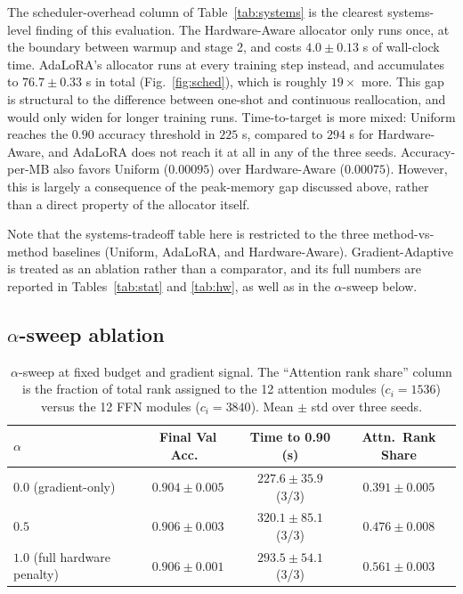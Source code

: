 \documentclass{article}
\begin{document}
The scheduler-overhead column of Table~\ref{tab:systems} is the
clearest systems-level finding of this evaluation. The Hardware-Aware
allocator only runs once, at the boundary between warmup and stage 2,
and costs $\mathbf{4.0 \pm 0.13}$ s of wall-clock time. AdaLoRA's
allocator runs at every training step instead, and accumulates to
$\mathbf{76.7 \pm 0.33}$ s in total (Fig.~\ref{fig:sched}), which is
roughly $19\times$ more. This gap is structural to the difference
between one-shot and continuous reallocation, and would only widen for
longer training runs. Time-to-target is more mixed: Uniform reaches
the $0.90$ accuracy threshold in $225$ s, compared to $294$ s for
Hardware-Aware, and AdaLoRA does not reach it at all in any of the
three seeds. Accuracy-per-MB also favors Uniform ($0.00095$) over
Hardware-Aware ($0.00075$). However, this is largely a consequence of
the peak-memory gap discussed above, rather than a direct property of
the allocator itself.

Note that the systems-tradeoff table here is restricted to the three
method-vs-method baselines (Uniform, AdaLoRA, and Hardware-Aware).
Gradient-Adaptive is treated as an ablation rather than a comparator,
and its full numbers are reported in Tables~\ref{tab:stat} and
\ref{tab:hw}, as well as in the $\alpha$-sweep below.

\subsection{$\alpha$-sweep ablation}
\label{sec:results-alpha}

\begin{table}[t]
\caption{$\alpha$-sweep at fixed budget and gradient signal. The
``Attention rank share'' column is the fraction of total rank assigned
to the 12 attention modules ($c_i{=}1536$) versus the 12 FFN modules
($c_i{=}3840$). Mean $\pm$ std over three seeds.}
\label{tab:alpha}
\vskip 0.05in
\centering
\small
\begin{tabular}{lccc}
\toprule
$\alpha$ & Final Val Acc.\ & Time to 0.90 (s) & Attn.\ Rank Share \\
\midrule
$0.0$ (gradient-only)        & $0.904 \pm 0.005$ & $227.6 \pm 35.9$ (3/3) & $0.391 \pm 0.005$ \\
$0.5$                        & $0.906 \pm 0.003$ & $320.1 \pm 85.1$ (3/3) & $0.476 \pm 0.008$ \\
$1.0$ (full hardware penalty)& $0.906 \pm 0.001$ & $293.5 \pm 54.1$ (3/3) & $0.561 \pm 0.003$ \\
\bottomrule
\end{tabular}
\vskip -0.05in
\end{table}
\end{document}
